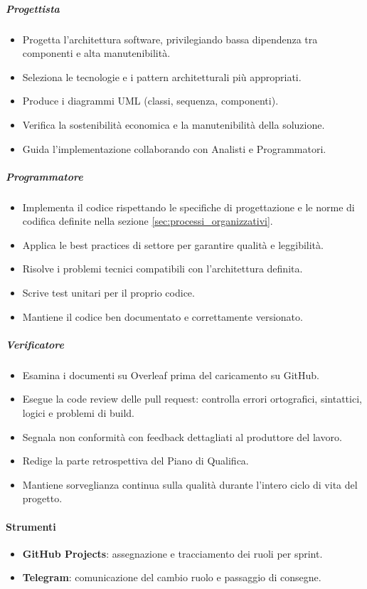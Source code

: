 \documentclass[a4paper, 11pt, oneside]{scrartcl}
\begin{document}
\subparagraph{Progettista}
\begin{itemize}
    \item Progetta l'architettura software, privilegiando bassa dipendenza tra componenti e alta manutenibilità.
    \item Seleziona le tecnologie e i pattern architetturali{\scriptsize{}} più appropriati.
    \item Produce i diagrammi UML (classi, sequenza, componenti).
    \item Verifica la sostenibilità economica e la manutenibilità della soluzione.
    \item Guida l'implementazione collaborando con Analisti e Programmatori.
\end{itemize}

\subparagraph{Programmatore}
\begin{itemize}
    \item Implementa il codice rispettando le specifiche di progettazione e le norme di codifica definite nella sezione \ref{sec:processi_organizzativi}.
    \item Applica le best practices{\scriptsize{}} di settore per garantire qualità e leggibilità.
    \item Risolve i problemi tecnici compatibili con l'architettura definita.
    \item Scrive test unitari per il proprio codice.
    \item Mantiene il codice ben documentato e correttamente versionato.
\end{itemize}

\subparagraph{Verificatore}
\begin{itemize}
    \item Esamina i documenti su Overleaf prima del caricamento su GitHub.
    \item Esegue la code review delle pull request: controlla errori ortografici, sintattici, logici e problemi di build.
    \item Segnala non conformità con feedback dettagliati al produttore del lavoro.
    \item Redige la parte retrospettiva del Piano di Qualifica{\scriptsize{}}.
    \item Mantiene sorveglianza continua sulla qualità durante l'intero ciclo di vita del progetto.
\end{itemize}

\paragraph{Strumenti}
\begin{itemize}
    \item \textbf{GitHub Projects}: assegnazione e tracciamento dei ruoli per sprint.
    \item \textbf{Telegram}: comunicazione del cambio ruolo e passaggio di consegne.
\end{itemize}
\end{document}
